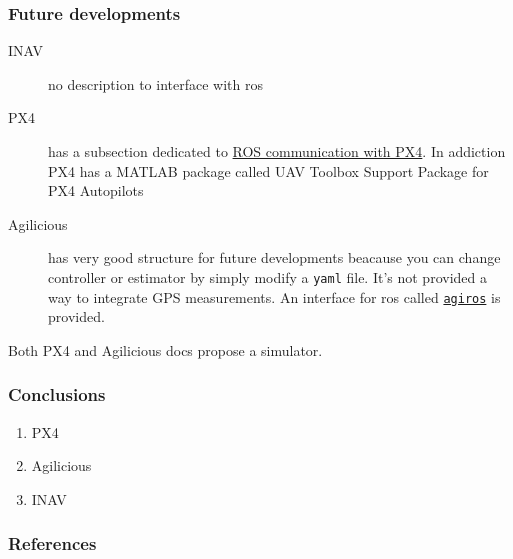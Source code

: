 \documentclass{beamer}
\begin{document}
\begin{frame} \frametitle{Future developments}
	\begin{description}
		\item[INAV] no description to interface with \ac{ros} 
		\item[PX4] has a subsection dedicated to \href{https://docs.px4.io/main/en/ros/}{ROS communication with PX4}. In addiction PX4 has a MATLAB package called UAV Toolbox Support Package for PX4 Autopilots \cite{mathworkspx4}
		\item[Agilicious] has very good structure for future developments beacause you can change controller or estimator by simply modify a \texttt{yaml} file. It's not provided a way to integrate GPS measurements. An interface  for \ac{ros} called \href{https://agilicious.readthedocs.io/en/main/integration/ros.html}{\texttt{agiros}} is provided.
	\end{description}
Both PX4 and Agilicious docs propose a simulator.
\end{frame}
	
\begin{frame} \frametitle{Conclusions}
	\begin{enumerate}
		\item PX4
		\item Agilicious
		\item INAV				
	\end{enumerate}
\end{frame}
	
	\begin{frame}[allowframebreaks]
		\frametitle{References}

		 
		
	\end{frame}
	
\end{document}
